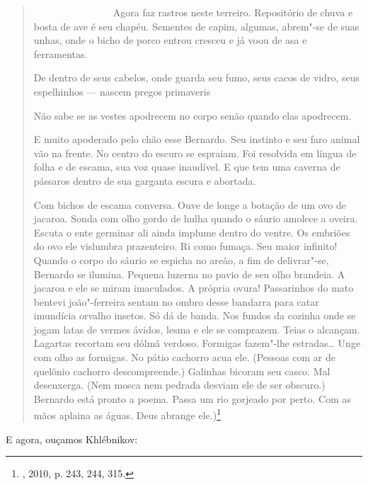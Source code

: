 \begin{quote}
~~~~~~~~~~~~~~~~Agora faz rastros neste terreiro. Repositório de chuva e
bosta de ave é seu chapéu. Sementes de capim, algumas, abrem"-se de suas
unhas, onde o bicho de porco entrou cresceu e já voou de asa e
ferramentas.

De dentro de seus cabelos, onde guarda seu fumo, seus cacos de vidro,
seus espelhinhos --- nascem pregos primaveris

Não sabe se as vestes apodrecem no corpo senão quando elas apodrecem.

E muito apoderado pelo chão esse Bernardo. Seu instinto e seu faro
animal vão na frente. No centro do escuro se espraiam. Foi resolvida em
língua de folha e de escama, sua voz quase inaudível. E que tem uma
caverna de pássaros dentro de sua garganta escura e abortada.

Com bichos de escama conversa. Ouve de longe a botação de um ovo de
jacaroa. Sonda com olho gordo de hulha quando o sáurio amolece a oveira.
Escuta o ente germinar ali ainda implume dentro do ventre. Os embriões
do ovo ele vislumbra prazenteiro. Ri como fumaça. Seu maior infinito!
Quando o corpo do sáurio se espicha no areão, a fim de delivrar"-se,
Bernardo se ilumina. Pequena luzerna no pavio de seu olho brandeia. A
jacaroa e ele se miram imaculados. A própria ovura! Passarinhos do mato
bentevi joão"-ferreira sentam no ombro desse bandarra para catar
imundícia orvalho insetos. Só dá de banda. Nos fundos da cozinha onde se
jogam latas de vermes ávidos, lesma e ele se comprazem. Teias o
alcançam. Lagartas recortam seu dólmã verdoso. Formigas fazem"-lhe
estradas\ldots{} Unge com olho as formigas. No pátio cachorro acua ele.
(Pessoas com ar de quelônio cachorro descompreende.) Galinhas bicoram
seu casco. Mal desenxerga. (Nem mosca nem pedrada desviam ele de ser
obscuro.) Bernardo está pronto a poema. Passa um rio gorjeado por perto.
Com as mãos aplaina as águas. Deus abrange ele.)\footnote{, 2010,
  p. 243, 244, 315.}
\end{quote}

E agora, ouçamos Khlébnikov:

